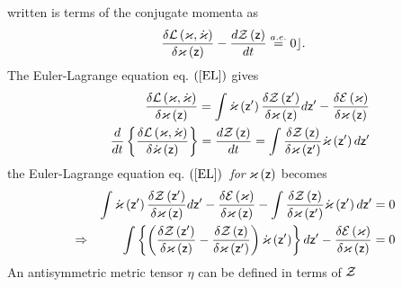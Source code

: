written is terms of the conjugate momenta as 
\begin{equation}
\frac{\delta {\cal L}\left( {\cal \varkappa },{\cal \dot{\varkappa}}\right) 
}{\delta {\cal \varkappa }\left( {\sf z}\right) }-\frac{d{\cal Z\left( {\sf z%
}\right) }}{dt}\stackrel{a.e.}{=}0\rfloor .
\end{equation}%
The Euler-Lagrange equation eq. $\left( \ref{EL}\right) $ gives 
\begin{eqnarray}
&&\frac{\delta {\cal L}\left( {\cal \varkappa },{\cal \dot{\varkappa}}%
\right) }{\delta {\cal \varkappa }\left( {\sf z}\right) }=\int {\cal \dot{%
\varkappa}}\left( {\sf z}^{\prime }\right) \frac{\delta {\cal Z}\left( {\sf z%
}^{\prime }\right) }{\delta {\cal \varkappa }\left( {\sf z}\right) }d{\sf z}%
^{\prime }-\frac{\delta {\cal E}\left( {\cal \varkappa }\right) }{\delta 
{\cal \varkappa }\left( {\sf z}\right) } \\
&&\frac{d}{dt}\left\{ \frac{\delta {\cal L}\left( {\cal \varkappa },{\cal 
\dot{\varkappa}}\right) }{\delta {\cal \dot{\varkappa}}\left( {\sf z}\right) 
}\right\} =\frac{d{\cal Z}\left( {\sf z}\right) }{dt}=\int \frac{\delta 
{\cal Z}\left( {\sf z}\right) }{\delta {\cal \varkappa }\left( {\sf z}%
^{\prime }\right) }{\cal \dot{\varkappa}}\left( {\sf z}^{\prime }\right) d%
{\sf z}^{\prime }
\end{eqnarray}%
the Euler-Lagrange equation eq. $\left( \ref{EL}\right) ${\em \ for} ${\cal %
\varkappa }\left( {\sf z}\right) $ becomes 
\begin{eqnarray}
&&\int {\cal \dot{\varkappa}}\left( {\sf z}^{\prime }\right) \frac{\delta 
{\cal Z}\left( {\sf z}^{\prime }\right) }{\delta {\cal \varkappa }\left( 
{\sf z}\right) }d{\sf z}^{\prime }-\frac{\delta {\cal E}\left( {\cal %
\varkappa }\right) }{\delta {\cal \varkappa }\left( {\sf z}\right) }-\int 
\frac{\delta {\cal Z}\left( {\sf z}\right) }{\delta {\cal \varkappa }\left( 
{\sf z}^{\prime }\right) }{\cal \dot{\varkappa}}\left( {\sf z}^{\prime
}\right) d{\sf z}^{\prime }=0 \\
&\Rightarrow &\int \left\{ \left( \frac{\delta {\cal Z}\left( {\sf z}%
^{\prime }\right) }{\delta {\cal \varkappa }\left( {\sf z}\right) }-\frac{%
\delta {\cal Z}\left( {\sf z}\right) }{\delta {\cal \varkappa }\left( {\sf z}%
^{\prime }\right) }\right) {\cal \dot{\varkappa}}\left( {\sf z}^{\prime
}\right) \right\} d{\sf z}^{\prime }-\frac{\delta {\cal E}\left( {\cal %
\varkappa }\right) }{\delta {\cal \varkappa }\left( {\sf z}\right) }=0
\end{eqnarray}%
An antisymmetric metric tensor $\eta $ can be defined in terms of ${\cal Z}$
